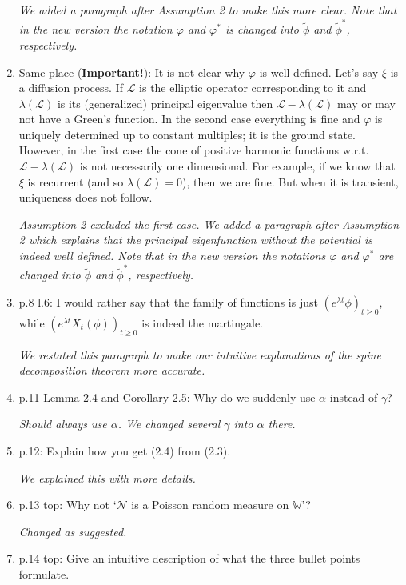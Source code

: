 \documentclass[12pt,a4paper]{amsart}
\numberwithin{equation}{section}
\theoremstyle{plain}
\theoremstyle{definition}
\begin{document}
\begin{enumerate}
  {\it We added a paragraph after Assumption 2 to make this more clear. 
    Note that in the new version the notation $\varphi$ and $\varphi^*$ is changed into $\widetilde \phi$ and $\widetilde \phi^*$, respectively.}
\item
  Same place ({\bf Important!}): It is not clear why $\varphi$ is well defined. 
  Let's say $\xi$ is a diffusion process.
  If $\mathcal L$ is the elliptic operator corresponding to it and $\lambda(\mathcal L)$ is its (generalized) principal eigenvalue then $\mathcal L - \lambda(\mathcal L)$ may or may not have a Green's function.
  In the second case everything is fine and $\varphi$ is uniquely determined up to constant multiples; it is the ground state.
  However, in the first case the cone of positive harmonic functions w.r.t. $\mathcal L - \lambda(\mathcal L)$ is not necessarily one dimensional. 
  For example, if we know that $\xi$ is recurrent (and so $\lambda(\mathcal L) = 0$), then we are fine.
  But when it is transient, uniqueness does not follow.
  
  {\it Assumption 2 excluded the first case. We added a paragraph after Assumption 2 which explains that the principal eigenfunction without the potential is indeed well defined. 
    Note that in the new version the notations $\varphi$ and $\varphi^*$ are changed into $\widetilde \phi$ and $\widetilde \phi^*$, respectively.}
\item
  p.8 l.6: I would rather say that the family of functions is just $(e^{\lambda t} \phi)_{t\geq 0}$, while $(e^{\lambda t} X_t(\phi))_{t\geq 0}$ is indeed the martingale.
  
  {\it We restated this paragraph to make our intuitive explanations of the spine decomposition theorem more accurate. }
\item
  p.11 Lemma 2.4 and Corollary 2.5:
  Why do we suddenly use $\alpha$ instead of $\gamma$?
  
  {\it Should always use $\alpha$.
     We changed several $\gamma$ into $\alpha$ there.} 
\item
  p.12: Explain how you get (2.4) from (2.3).
  
  {\it We explained this with more details.}
\item
  p.13 top: Why not `$\mathcal N$ is a Poisson random measure on $\mathbb W$'?
  
  {\it Changed as suggested.}
\item
  p.14 top: Give an intuitive description of what the three bullet points formulate.
  

\end{enumerate}
\end{document}
